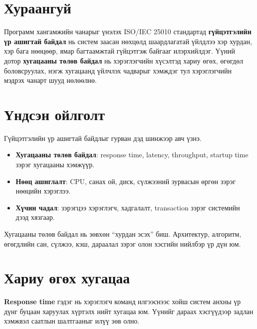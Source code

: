 \documentclass[10pt,a4paper,twocolumn]{article}
\begin{document}
\fontsize{8.4}{9.6}\selectfont

\fontsize{8.4}{9.6}\selectfont

\section{Хураангуй}
Программ хангамжийн чанарыг үнэлэх ISO/IEC 25010 стандартад \textbf{гүйцэтгэлийн үр ашигтай байдал} нь систем заасан нөхцөлд шаардлагатай үйлдлээ хэр хурдан, хэр бага нөөцөөр, ямар багтаамжтай гүйцэтгэж байгааг илэрхийлдэг. Үүний дотор \textbf{хугацааны төлөв байдал} нь хэрэглэгчийн хүсэлтэд хариу өгөх, өгөгдөл боловсруулах, нэгж хугацаанд үйлчлэх чадварыг хэмждэг тул хэрэглэгчийн мэдрэх чанарт шууд нөлөөлнө.

\section{Үндсэн ойлголт}
Гүйцэтгэлийн үр ашигтай байдлыг гурван дэд шинжээр авч үзнэ.

\begin{itemize}
  \item \textbf{Хугацааны төлөв байдал}: response time, latency, throughput, startup time зэрэг хугацааны хэмжүүр.
  \item \textbf{Нөөц ашиглалт}: CPU, санах ой, диск, сүлжээний зурвасын өргөн зэрэг нөөцийн хэрэглээ.
  \item \textbf{Хүчин чадал}: зэрэгцээ хэрэглэгч, хадгалалт, transaction зэрэг системийн дээд хязгаар.
\end{itemize}

Хугацааны төлөв байдал нь зөвхөн ``хурдан эсэх'' биш. Архитектур, алгоритм, өгөгдлийн сан, сүлжээ, кэш, дараалал зэрэг олон хэсгийн нийлбэр үр дүн юм.

\section{Хариу өгөх хугацаа}
\textbf{Response time} гэдэг нь хэрэглэгч команд илгээснээс хойш систем анхны үр дүнг буцаан харуулах хүртэлх нийт хугацаа юм. Үүнийг дараах хэсгүүдээр задлан хэмжвэл саатлын шалтгааныг илүү зөв олно.
\end{document}
